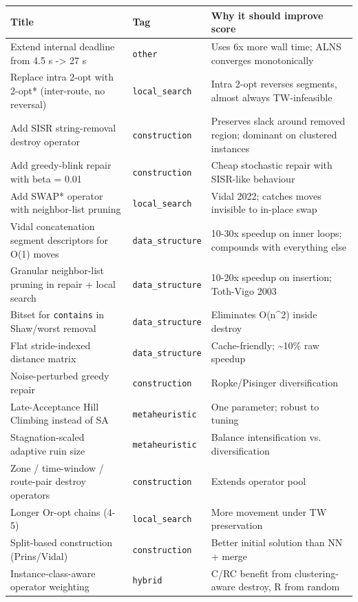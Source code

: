 \documentclass[twocolumn,10pt,letterpaper]{article}
\begin{document}
\vspace{0.4em}
\noindent
\small
\begin{tabularx}{\columnwidth}{@{}XXX@{}}
\toprule
\textbf{Title} & \textbf{Tag} & \textbf{Why it should improve score} \\
\midrule
Extend internal deadline from 4.5 s -> 27 s & \texttt{other} & Uses 6x more wall time; ALNS converges monotonically \\
Replace intra 2-opt with 2-opt* (inter-route, no reversal) & \texttt{local\_search} & Intra 2-opt reverses segments, almost always TW-infeasible \\
Add SISR string-removal destroy operator & \texttt{construction} & Preserves slack around removed region; dominant on clustered instances \\
Add greedy-blink repair with beta = 0.01 & \texttt{construction} & Cheap stochastic repair with SISR-like behaviour \\
Add SWAP* operator with neighbor-list pruning & \texttt{local\_search} & Vidal 2022; catches moves invisible to in-place swap \\
Vidal concatenation segment descriptors for O(1) moves & \texttt{data\_structure} & 10-30x speedup on inner loops; compounds with everything else \\
Granular neighbor-list pruning in repair + local search & \texttt{data\_structure} & 10-20x speedup on insertion; Toth-Vigo 2003 \\
Bitset for \texttt{contains} in Shaw/worst removal & \texttt{data\_structure} & Eliminates O(n\^{}2) inside destroy \\
Flat stride-indexed distance matrix & \texttt{data\_structure} & Cache-friendly; \textasciitilde{}10\% raw speedup \\
Noise-perturbed greedy repair & \texttt{construction} & Ropke/Pisinger diversification \\
Late-Acceptance Hill Climbing instead of SA & \texttt{metaheuristic} & One parameter; robust to tuning \\
Stagnation-scaled adaptive ruin size & \texttt{metaheuristic} & Balance intensification vs. diversification \\
Zone / time-window / route-pair destroy operators & \texttt{construction} & Extends operator pool \\
Longer Or-opt chains (4-5) & \texttt{local\_search} & More movement under TW preservation \\
Split-based construction (Prins/Vidal) & \texttt{construction} & Better initial solution than NN + merge \\
Instance-class-aware operator weighting & \texttt{hybrid} & C/RC benefit from clustering-aware destroy, R from random \\
\bottomrule
\end{tabularx}
\vspace{0.4em}
\end{document}
